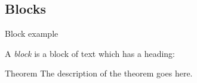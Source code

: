 \subsection{Blocks}
  
\begin{frame}{Block example}

  A \textit{block} is a block of text which has a heading:

  \begin{block}{Theorem}
    The description of the theorem goes here.
  \end{block}

\end{frame}